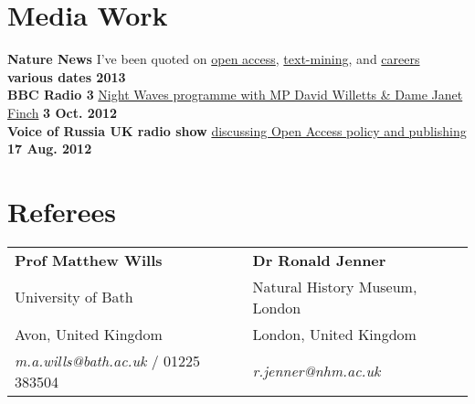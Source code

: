 \documentclass[margin,line]{resume}
\begin{document}
\begin{resume}
    \section{\mysidestyle Media Work}
\textbf{Nature News} I've been quoted on \href{http://dx.doi.org/10.1038/nature.2013.12384}{open access}, \href{http://dx.doi.org/10.1038/495295a}{text-mining}, and \href{http://dx.doi.org/10.1038/nj7442-539a}{careers} \hfill \textbf{various dates 2013}\\
\textbf{BBC Radio 3} \href{http://www.bbc.co.uk/iplayer/episode/b01n1rth/Night_Waves_Open_Accesss_Anne_Applebaum_Berenice/}{Night Waves programme with MP David Willetts \& Dame Janet Finch} \hfill \textbf{3 Oct. 2012}\\
\textbf{Voice of Russia UK radio show} \href{http://ruvr.co.uk/2012_08_17/85416708/}{discussing Open Access policy and publishing} \hfill \textbf{17 Aug. 2012}\\


\vspace{-7 mm} 
 



\section{\mysidestyle Referees} 

\begin{tabular}{@{}p{6cm}p{6cm}}
\textbf{Prof Matthew Wills}              &  \textbf{Dr Ronald Jenner}     \\
University of Bath                     &  Natural History Museum, London    \\
Avon, United Kingdom           &  London, United Kingdom      \\
\textsl{m.a.wills@bath.ac.uk} / 01225 383504     &   \textsl{r.jenner@nhm.ac.uk}    \\

\end{tabular}


\end{resume}
\end{document}
